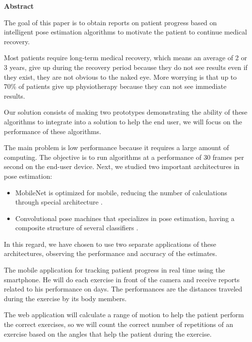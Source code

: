 \begin{center}
 \textbf{Abstract}
\end{center}
\vspace{0.4cm}

The goal of this paper is to obtain reports on patient progress based on intelligent pose estimation  algorithms to motivate the patient to continue medical recovery.

 Most patients require long-term medical recovery, which means an average of 2 or 3 years, give up during the recovery period because they do not see results even if they exist, they are not obvious to the naked eye.
More worrying is that up to 70\% of patients give up physiotherapy because they can not see immediate results.

Our solution consists of making two prototypes demonstrating the ability of these algorithms to integrate into a solution to help the end user, we will focus on the performance of these algorithms.

The main problem is low performance because it requires a large amount of computing.
The objective is to run algorithms at a performance of 30 frames per second on the end-user device.
Next, we studied two important architectures in pose estimation:
\begin{itemize}
    \item MobileNet is optimized for mobile, reducing the number of calculations through special architecture \cite{DBLP:journals/corr/HowardZCKWWAA17}.
    \item Convolutional pose machines that specializes in pose estimation, having a composite structure of several classifiers \cite{DBLP:journals/corr/WeiRKS16}.
\end{itemize}

In this regard, we have chosen to use two separate applications of these architectures, observing the performance and accuracy of the estimates.

The mobile application for tracking patient progress in real time using the smartphone.
He will do each exercise in front of the camera and receive reports related to his performance on days.
The performances are the distances traveled during the exercise by its body members.

The web application will calculate a range of motion to help the patient perform the correct exercises, so we will count the correct number of repetitions of an exercise based on the angles that help the patient during the exercise.

